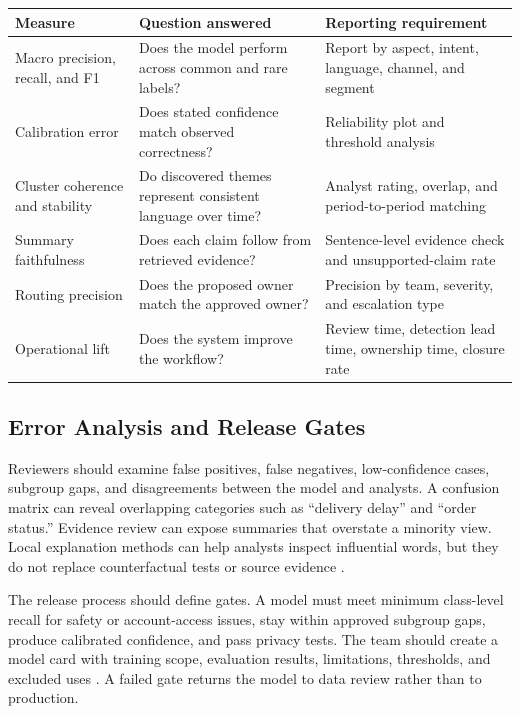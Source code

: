 \documentclass[11pt,a4paper,twoside]{article}
\begin{document}
\begin{tabularx}{\textwidth}{|>{\raggedright\arraybackslash}p{3.05cm}|Y|Y|}
\hline
\textbf{Measure} & \textbf{Question answered} & \textbf{Reporting requirement} \\ \hline
Macro precision, recall, and F1 & Does the model perform across common and rare labels? & Report by aspect, intent, language, channel, and segment \\ \hline
Calibration error & Does stated confidence match observed correctness? & Reliability plot and threshold analysis \\ \hline
Cluster coherence and stability & Do discovered themes represent consistent language over time? & Analyst rating, overlap, and period-to-period matching \\ \hline
Summary faithfulness & Does each claim follow from retrieved evidence? & Sentence-level evidence check and unsupported-claim rate \\ \hline
Routing precision & Does the proposed owner match the approved owner? & Precision by team, severity, and escalation type \\ \hline
Operational lift & Does the system improve the workflow? & Review time, detection lead time, ownership time, closure rate \\ \hline
\end{tabularx}

\subsection{Error Analysis and Release Gates}

Reviewers should examine false positives, false negatives, low-confidence cases, subgroup gaps, and disagreements between the model and analysts. A confusion matrix can reveal overlapping categories such as ``delivery delay'' and ``order status.'' Evidence review can expose summaries that overstate a minority view. Local explanation methods can help analysts inspect influential words, but they do not replace counterfactual tests or source evidence \cite{ribeiro2016}.

The release process should define gates. A model must meet minimum class-level recall for safety or account-access issues, stay within approved subgroup gaps, produce calibrated confidence, and pass privacy tests. The team should create a model card with training scope, evaluation results, limitations, thresholds, and excluded uses \cite{mitchell2019}. A failed gate returns the model to data review rather than to production.
\end{document}
